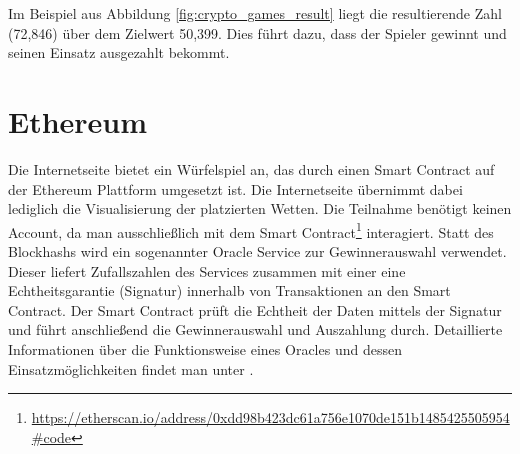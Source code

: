 Im Beispiel aus Abbildung \ref{fig:crypto_games_result} liegt die resultierende Zahl (72,846) über dem Zielwert 50,399. Dies führt dazu, dass der Spieler gewinnt und seinen Einsatz ausgezahlt bekommt.

\section{Ethereum}

Die Internetseite \cite{vdice} bietet ein Würfelspiel an, das durch einen Smart Contract auf der Ethereum Plattform umgesetzt ist. Die Internetseite übernimmt dabei lediglich die Visualisierung der platzierten Wetten. Die Teilnahme benötigt keinen Account, da man ausschließlich mit dem Smart Contract\footnote{\url{https://etherscan.io/address/0xdd98b423dc61a756e1070de151b1485425505954\#code}} interagiert. Statt des Blockhashs wird ein sogenannter Oracle Service \cite{oracalize_it} zur Gewinnerauswahl verwendet. Dieser liefert Zufallszahlen des Services \cite{random_org} zusammen mit einer eine Echtheitsgarantie (Signatur) innerhalb von Transaktionen an den Smart Contract. Der Smart Contract prüft die Echtheit der Daten mittels der Signatur und führt anschließend die Gewinnerauswahl und Auszahlung durch. Detaillierte Informationen über die Funktionsweise eines Oracles und dessen Einsatzmöglichkeiten findet man unter \cite{eth_oracles}.